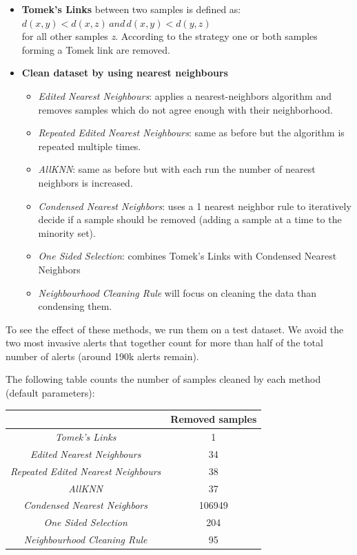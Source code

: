\begin{itemize}
	\item \textbf{Tomek's Links} between two samples is defined as: $d(x,y) < d(x,z) \, and \, d(x,y) < d(y,z)$\\for all other samples \textit{z}. According to the strategy one or both samples forming a Tomek link are removed.
	\item \textbf{Clean dataset by using nearest neighbours}
	\begin{itemize}
		\item \textit{Edited Nearest Neighbours}: applies a nearest-neighbors algorithm and removes samples which do not agree enough with their neighborhood.
		\item \textit{Repeated Edited Nearest Neighbours}: same as before but the algorithm is repeated multiple times.
		\item \textit{AllKNN}: same as before but with each run the number of nearest neighbors is increased.
		\item \textit{Condensed Nearest Neighbors}: uses a 1 nearest neighbor rule to iteratively decide if a sample should be removed (adding a sample at a time to the minority set).
		\item \textit{One Sided Selection}: combines Tomek's Links with Condensed Nearest Neighbors
		\item \textit{Neighbourhood Cleaning Rule} will focus on cleaning the data than condensing them.
	\end{itemize}
\end{itemize}

To see the effect of these methods, we run them on a test dataset. We avoid the two most invasive alerts that together count for more than half of the total number of alerts (around 190k alerts remain).

The following table counts the number of samples cleaned by each method (default parameters):

\begin{table}[H]
	\centering
	\begin{tabular}{cc}
		\hline
		& \textbf{Removed samples} \\ \hline
		\textit{Tomek's Links}                      & 1                        \\
		\textit{Edited Nearest Neighbours}          & 34                       \\
		\textit{Repeated Edited Nearest Neighbours} & 38                       \\
		\textit{AllKNN}                             & 37                       \\
		\textit{Condensed Nearest Neighbors}        & 106949                   \\
		\textit{One Sided Selection}                & 204                      \\
		\textit{Neighbourhood Cleaning Rule}        & 95                       \\ \hline
	\end{tabular}
\end{table}

